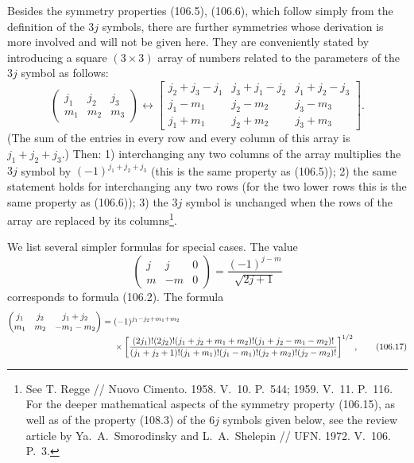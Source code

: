 Besides the symmetry properties (106.5), (106.6), which follow simply from the definition of the $3j$ symbols, there are further symmetries whose derivation is more involved and will not be given here. They are conveniently stated by introducing a square $(3\times3)$ array of numbers related to the parameters of the $3j$ symbol as follows:
\begin{equation}
\begin{pmatrix}j_1&j_2&j_3\\m_1&m_2&m_3\end{pmatrix}
\longleftrightarrow
\begin{bmatrix}
j_2+j_3-j_1&j_3+j_1-j_2&j_1+j_2-j_3\\
j_1-m_1&j_2-m_2&j_3-m_3\\
j_1+m_1&j_2+m_2&j_3+m_3
\end{bmatrix}.
\tag{106.15}
\end{equation}
(The sum of the entries in every row and every column of this array is $j_1+j_2+j_3$.) Then: 1) interchanging any two columns of the array multiplies the $3j$ symbol by $(-1)^{j_1+j_2+j_3}$ (this is the same property as (106.5)); 2) the same statement holds for interchanging any two rows (for the two lower rows this is the same property as (106.6)); 3) the $3j$ symbol is unchanged when the rows of the array are replaced by its columns\footnote{See T. Regge // Nuovo Cimento. 1958. V.~10. P.~544; 1959. V.~11. P.~116. For the deeper mathematical aspects of the symmetry property (106.15), as well as of the property (108.3) of the $6j$ symbols given below, see the review article by Ya.~A.~Smorodinsky and L.~A.~Shelepin // UFN. 1972. V.~106. P.~3.}.

We list several simpler formulas for special cases. The value
\begin{equation}
 \begin{pmatrix}j&j&0\\m&-m&0\end{pmatrix}=\frac{(-1)^{j-m}}{\sqrt{2j+1}}
 \tag{106.16}
\end{equation}
corresponds to formula (106.2). The formula
\begingroup\small
\begin{align}
\begin{pmatrix}j_1&j_2&j_1+j_2\\m_1&m_2&-m_1-m_2\end{pmatrix}
={}&(-1)^{j_1-j_2+m_1+m_2}\notag\\[-2pt]
&\times\left[\frac{(2j_1)!(2j_2)!(j_1+j_2+m_1+m_2)!(j_1+j_2-m_1-m_2)!}{(j_1+j_2+1)!(j_1+m_1)!(j_1-m_1)!(j_2+m_2)!(j_2-m_2)!}\right]^{1/2},
\tag{106.17}
\end{align}
\endgroup

